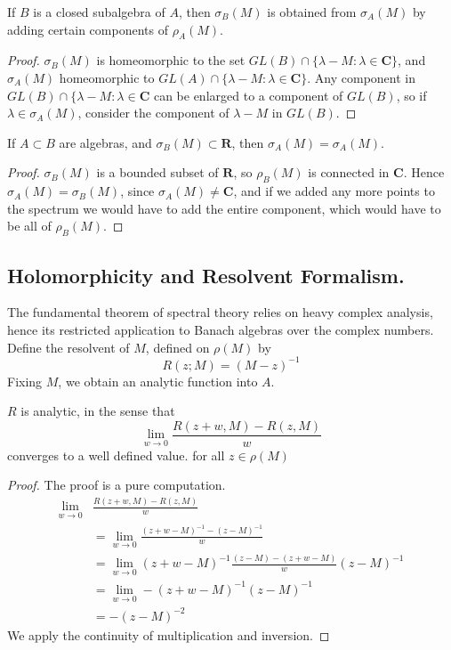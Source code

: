 \begin{corollary}
    If $B$ is a closed subalgebra of $A$, then $\sigma_B(M)$ is obtained from $\sigma_A(M)$ by adding certain components of $\rho_A(M)$.
\end{corollary}
\begin{proof}
    $\sigma_B(M)$ is homeomorphic to the set $GL(B) \cap \{ \lambda - M : \lambda \in \mathbf{C} \}$, and $\sigma_A(M)$ homeomorphic to $GL(A) \cap \{ \lambda - M : \lambda \in \mathbf{C} \}$. Any component in $GL(B) \cap \{ \lambda - M : \lambda \in \mathbf{C}$ can be enlarged to a component of $GL(B)$, so if $\lambda \in \sigma_A(M)$, consider the component of $\lambda - M$ in $GL(B)$.
\end{proof}

\begin{corollary}
    If $A \subset B$ are algebras, and $\sigma_B(M) \subset \mathbf{R}$, then $\sigma_A(M) = \sigma_A(M)$.
\end{corollary}
\begin{proof}
    $\sigma_B(M)$ is a bounded subset of $\mathbf{R}$, so $\rho_B(M)$ is connected in $\mathbf{C}$. Hence $\sigma_A(M) = \sigma_B(M)$, since $\sigma_A(M) \neq \mathbf{C}$, and if we added any more points to the spectrum we would have to add the entire component, which would have to be all of $\rho_B(M)$.
\end{proof}

\subsection{Holomorphicity and Resolvent Formalism.}

The fundamental theorem of spectral theory relies on heavy complex analysis, hence its restricted application to Banach algebras over the complex numbers. Define the resolvent of $M$, defined on $\rho(M)$ by
%
\[ R(z; M) = (M - z)^{-1} \]
%
Fixing $M$, we obtain an analytic function into $A$.

\begin{lemma}
    $R$ is analytic, in the sense that
    \[ \lim_{w \to 0} \frac{R(z + w, M) - R(z,M)}{w} \]
    converges to a well defined value. for all $z \in \rho(M)$
\end{lemma}
\begin{proof}
    The proof is a pure computation.
    \begin{align*}
        \lim_{w \to 0} &\frac{R(z + w, M) - R(z,M)}{w}\\
        &= \lim_{w \to 0} \frac{(z + w - M)^{-1} - (z - M)^{-1}}{w}\\
        &= \lim_{w \to 0} (z + w - M)^{-1} \frac{(z - M) - (z + w - M)}{w} (z - M)^{-1}\\
        &= \lim_{w \to 0} -(z + w - M)^{-1} (z - M)^{-1}\\
        &= -(z - M)^{-2}
    \end{align*}
    We apply the continuity of multiplication and inversion.
\end{proof}

